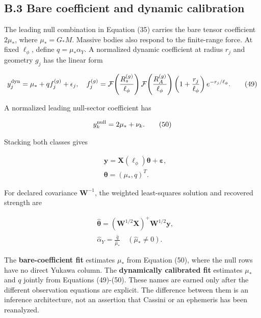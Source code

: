 \documentclass[
  american,
  11pt,
  letterpaper,
]{article}
\begin{document}
\subsection{B.3 Bare coefficient and dynamic calibration}\label{b.3-bare-coefficient-and-dynamic-calibration}

The leading null combination in Equation (35) carries the bare tensor coefficient \(2\mu_*\), where \(\mu_*=G_*M\). Massive bodies also respond to the finite-range force. At fixed \(\ell_\phi\), define \(q=\mu_*\alpha_Y\). A normalized dynamic coefficient at radius \(r_j\) and geometry \(g_j\) has the linear form

\begin{equation}
y_j^{\rm dyn}
=\mu_*+q f_j^{(g)}+\epsilon_j,
\quad
f_j^{(g)}
=\mathcal F\!\left(\frac{R_s^{(g)}}{\ell_\phi}\right)
\mathcal F\!\left(\frac{R_A^{(g)}}{\ell_\phi}\right)
\left(1+\frac{r_j}{\ell_\phi}\right)e^{-r_j/\ell_\phi}.
\tag{49}
\end{equation}

A normalized leading null-sector coefficient has

\begin{equation}
y_k^{\rm null}=2\mu_*+\nu_k.
\tag{50}
\end{equation}

Stacking both classes gives

\begin{equation}
\begin{aligned}
& \mathbf y=\mathbf X(\ell_\phi)\boldsymbol\theta+\boldsymbol\varepsilon, \\
& \boldsymbol\theta=(\mu_*,q)^T.
\end{aligned}
\tag{51}
\end{equation}

For declared covariance \(\mathbf W^{-1}\), the weighted least-squares solution and recovered strength are

\begin{equation}
\begin{aligned}
& \widehat{\boldsymbol\theta}
=\left(\mathbf W^{1/2}\mathbf X\right)^+
\mathbf W^{1/2}\mathbf y, \\
& \widehat\alpha_Y=\frac{\widehat q}{\widehat\mu_*}
\quad(\widehat\mu_*\ne0).
\end{aligned}
\tag{52}
\end{equation}

The \textbf{bare-coefficient fit} estimates \(\mu_*\) from Equation (50), where the null rows have no direct Yukawa column. The \textbf{dynamically calibrated fit} estimates \(\mu_*\) and \(q\) jointly from Equations (49)-(50). These names are earned only after the different observation equations are explicit. The difference between them is an inference architecture, not an assertion that Cassini or an ephemeris has been reanalyzed.
\end{document}
